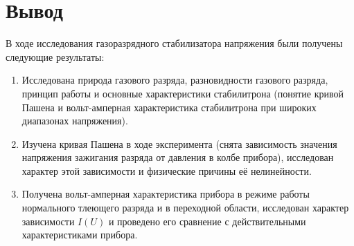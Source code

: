 \documentclass[a4paper]{article}
\begin{document}
\section{Вывод}
В ходе исследования газоразрядного стабилизатора напряжения были получены следующие результаты:

\begin{enumerate}
    \item Исследована природа газового разряда, разновидности газового разряда, принцип работы и основные характеристики стабилитрона (понятие кривой Пашена и вольт-амперная характеристика стабилитрона при широких диапазонах напряжения).
    \item Изучена кривая Пашена в ходе эксперимента (снята зависимость значения напряжения зажигания разряда от давления в колбе прибора), исследован характер этой зависимости и физические причины её нелинейности.
    \item Получена вольт-амперная характеристика прибора в режиме работы нормального тлеющего разряда и в переходной области, исследован характер зависимости $I(U)$ и проведено его сравнение с действительными характеристиками прибора.
\end{enumerate}
\end{document}
